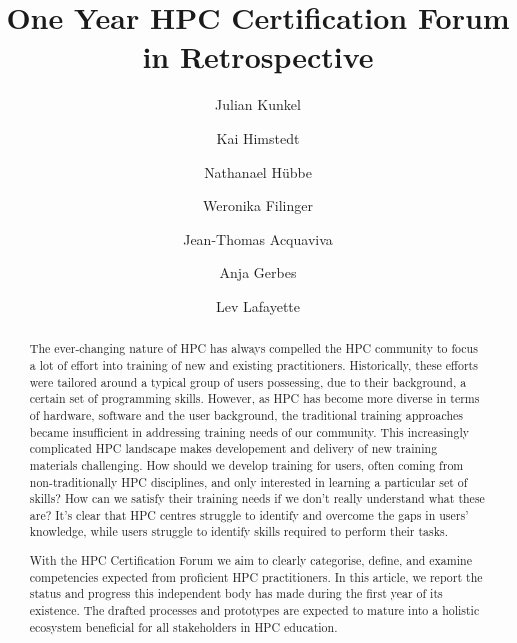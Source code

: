\documentclass[jocse]{jocseart}
\begin{document}
\title{One Year HPC Certification Forum in Retrospective}

\author{Julian Kunkel}


\author{Kai Himstedt}
\author{Nathanael Hübbe}

\author{Weronika Filinger}

\author{Jean-Thomas Acquaviva}


\author{Anja Gerbes}

\author{Lev Lafayette}

\renewcommand{\shortauthors}{J. Kunkel et al.}


\begin{abstract}

The ever-changing nature of HPC has always compelled the HPC community to focus a lot of effort into training of new and existing practitioners. Historically, these efforts were tailored
 around a typical group of users possessing, due to their background, a certain set of programming skills. However, as HPC has become more diverse in terms of hardware, software and 
 the user background, the traditional training approaches became insufficient in addressing training needs of our community. This increasingly complicated HPC landscape makes 
 developement and delivery of new training materials challenging. How should we develop training for users, often coming from non-traditionally HPC disciplines, and only interested in 
 learning a particular set of skills? How can we satisfy their training needs if we don't really understand what these are? It's clear that HPC centres struggle to identify and overcome the 
 gaps in users' knowledge, while users struggle to identify skills required to perform their tasks. 

With the HPC Certification Forum we aim to clearly categorise, define, and examine competencies expected from proficient HPC practitioners. 
In this article, we report the status and progress this independent body has made during the first year of its existence. The drafted processes and prototypes are expected to mature into a 
holistic ecosystem beneficial for all stakeholders in HPC education.
\end{abstract}
\end{document}
